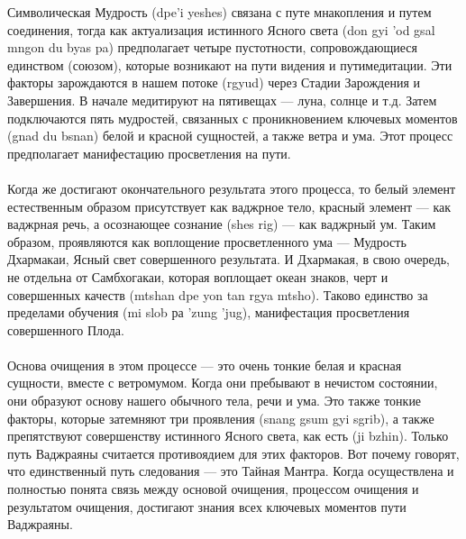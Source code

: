 \begin{siderules}
Символическая Мудрость (dpe'i yeshes) связана с путе мнакопления и путем соединения,
тогда как актуализация истинного Ясного света (don gyi 'od gsal mngon du byas pa)
предполагает четыре пустотности, сопровождающиеся единством (союзом), которые
возникают на пути видения и путимедитации. Эти факторы зарождаются в нашем потоке
(rgyud) через Стадии Зарождения и Завершения. В начале медитируют на пятивещах — луна,
солнце и т.д. Затем подключаются пять мудростей, связанных с проникновением ключевых
моментов (gnad du bsnan) белой и красной сущностей, а также ветра и ума. Этот процесс
предполагает манифестацию просветления на пути.\\
\\
Когда же достигают окончательного результата этого процесса, то белый элемент
естественным образом присут\-ствует как ваджрное тело, красный элемент — как ваджрная
речь, а осознающее сознание (shes rig) — как ваджрный ум. Таким образом, проявляются как
воплощение просветлен\-ного ума — Мудрость Дхармакаи, Ясный свет совершенного
результата. И Дхармакая, в свою очередь, не отдельна от Самбхогакаи, которая воплощает
океан знаков, черт и совершенных качеств (mtshan dpe yon tan rgya mtsho). Таково единство
за пределами обучения (mi slob ра 'zung 'jug), манифестация просветления совершенного
Плода.\\
\\
Основа очищения в этом процессе — это очень тонкие белая и красная сущности, вместе с
ветром\-умом. Когда они пребывают в нечистом состоянии, они образуют основу нашего
обычного тела, речи и ума. Это также тонкие факторы, которые затемняют три проявления
(snang gsum gyi sgrib), а также препятствуют совершенству истинного Ясного света, как есть
(ji bzhin). Только путь Ваджраяны считается противоядием для этих факторов. Вот почему
говорят, что единственный путь следования — это Тайная Мантра.
Когда осуществлена и полностью понята связь между основой очищения, процессом
очище\-ния и результатом очищения, достигают знания всех ключевых моментов пути
Ваджраяны.
\end{siderules}

